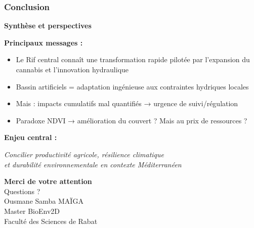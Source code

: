 \documentclass{beamer}
\begin{document}
\begin{frame}
\frametitle{Conclusion}
\begin{center}
  \textbf{\Large{Synthèse et perspectives}}
\end{center}

\textbf{Principaux messages :}
\begin{itemize}
  \item Le Rif central connaît une transformation rapide pilotée par l'expansion du cannabis et l'innovation hydraulique
  \item Bassin artificiels = adaptation ingénieuse aux contraintes hydriques locales
  \item Mais : impacts cumulatifs mal quantifiés → urgence de suivi/régulation
  \item Paradoxe NDVI → amélioration du couvert ?  Mais au prix de ressources ?
\end{itemize}

\textbf{Enjeu central :}
\begin{center}
  \textit{Concilier productivité agricole, résilience climatique \\ et durabilité environnementale en contexte Méditerranéen}
\end{center}
\end{frame}

\begin{frame}[plain]
\begin{center}
  \vfill
  {\Huge \textbf{Merci de votre attention}}
  \\[1cm]
  {\Large Questions ?}
  \\[2cm]
  \small{
    Ousmane Samba MAÏGA \\
    Master BioEnv2D \\
    Faculté des Sciences de Rabat
  }
  \vfill
\end{center}
\end{frame}
\end{document}
